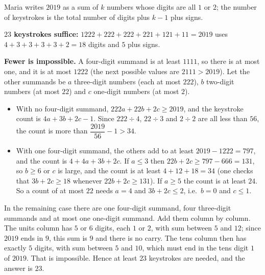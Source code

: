 Maria writes $2019$ as a sum of $k$ numbers whose digits are all $1$ or $2$; the number of keystrokes is the total number of digits plus $k-1$ plus signs.

\textbf{$23$ keystrokes suffice:} $1222+222+222+221+121+11=2019$ uses $4+3+3+3+3+2=18$ digits and $5$ plus signs.

\textbf{Fewer is impossible.} A four-digit summand is at least $1111$, so there is at most one, and it is at most $1222$ (the next possible values are $2111>2019$). Let the other summands be $a$ three-digit numbers (each at most $222$), $b$ two-digit numbers (at most $22$) and $c$ one-digit numbers (at most $2$).
\begin{itemize}
\item With no four-digit summand, $222a+22b+2c\ge2019$, and the keystroke count is $4a+3b+2c-1$. Since $222\div4$, $22\div3$ and $2\div2$ are all less than $56$, the count is more than $\dfrac{2019}{56}-1>34$.
\item With one four-digit summand, the others add to at least $2019-1222=797$, and the count is $4+4a+3b+2c$. If $a\le3$ then $22b+2c\ge797-666=131$, so $b\ge6$ or $c$ is large, and the count is at least $4+12+18=34$ (one checks that $3b+2c\ge18$ whenever $22b+2c\ge131$). If $a\ge5$ the count is at least $24$. So a count of at most $22$ needs $a=4$ and $3b+2c\le2$, i.e.\ $b=0$ and $c\le1$.
\end{itemize}
In the remaining case there are one four-digit summand, four three-digit summands and at most one one-digit summand. Add them column by column. The units column has $5$ or $6$ digits, each $1$ or $2$, with sum between $5$ and $12$; since $2019$ ends in $9$, this sum is $9$ and there is no carry. The tens column then has exactly $5$ digits, with sum between $5$ and $10$, which must end in the tens digit $1$ of $2019$. That is impossible. Hence at least $23$ keystrokes are needed, and the answer is $\boxed{23}$.
